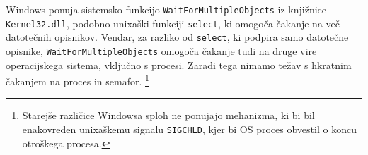 \documentclass[notitlepage]{report}
\begin{document}
Windows ponuja sistemsko funkcijo \verb|WaitForMultipleObjects| iz
knjižnice \verb|Kernel32.dll|, podobno unixaški funkciji
\verb|select|, ki omogoča čakanje na več datotečnih opisnikov. Vendar,
za razliko od \verb|select|, ki podpira samo datotečne opisnike,
\verb|WaitForMultipleObjects| omogoča čakanje tudi na druge vire
operacijskega sistema, vključno s procesi. Zaradi tega nimamo težav s
hkratnim čakanjem na proces in semafor. \footnote{Starejše različice
  Windowsa sploh ne ponujajo mehanizma, ki bi bil enakovreden
  unixaškemu signalu \verb|SIGCHLD|, kjer bi OS proces obvestil o
  koncu otroškega procesa.}


\end{document}
